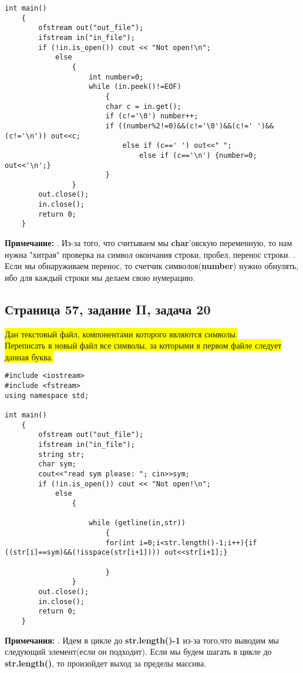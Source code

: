 \documentclass[11pt]{article}
\begin{document}
\begin{flushleft}
\begin{lstlisting}
int main()
	{
		ofstream out("out_file");
		ifstream in("in_file");
		if (!in.is_open()) cout << "Not open!\n";
			else
				{
					int number=0;
					while (in.peek()!=EOF)
						{
						char c = in.get();
						if (c!='\0') number++;
						if ((number%2!=0)&&(c!='\0')&&(c!=' ')&&(c!='\n')) out<<c;
							else if (c==' ') out<<" ";
								else if (c=='\n') {number=0; out<<'\n';}
						}
				}
		out.close();
		in.close();
		return 0;
	}
\end{lstlisting}


\textbf{Примечание:}
. Из-за того, что считываем мы \textbf{char}'овскую переменную, то нам нужна "хитрая" проверка на символ окончания строки, пробел, перенос строки.
. Если мы обнаруживаем перенос, то счетчик символов(\textbf{number}) нужно обнулять, ибо для каждый строки мы делаем свою нумерацию.

\newpage
\begin{center}
\section{Страница 57, задание II, задача 20}
\colorbox{yellow}{Дан текстовый файл, компонентами которого являются символы.}\\
\colorbox{yellow}{Переписать в новый файл все символы, за которыми в первом файле следует данная буква.}
\end{center}
\begin{lstlisting}
#include <iostream>
#include <fstream>
using namespace std;

int main()
	{
		ofstream out("out_file");
		ifstream in("in_file");
		string str;
		char sym;
		cout<<"read sym please: "; cin>>sym;
		if (!in.is_open()) cout << "Not open!\n";
			else
				{
					
					while (getline(in,str))
						{
						for(int i=0;i<str.length()-1;i++){if ((str[i]==sym)&&(!isspace(str[i+1]))) out<<str[i+1];}
						
						}
				}
		out.close();
		in.close();
		return 0;
	}
\end{lstlisting}

\textbf{Примечания:}
. Идем в цикле до \textbf{str.length()-1} из-за того,что выводим мы следующий элемент(если он подходит). Если мы будем шагать в цикле до \textbf{str.length()}, то произойдет выход за пределы массива.

\newpage
\begin{center}

\end{center}
\end{flushleft}
\end{document}
